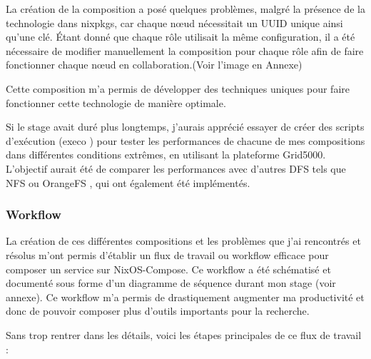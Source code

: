 \documentclass[a4paper,french,12pt, titlepage]{article}
\begin{document}
La création de la composition a posé quelques problèmes, malgré la
présence de la technologie dans nixpkgs, car chaque nœud nécessitait un
UUID unique ainsi qu'une clé. Étant donné que chaque rôle utilisait la
même configuration, il a été nécessaire de modifier manuellement la
composition pour chaque rôle afin de faire fonctionner chaque nœud en
collaboration.(Voir l'image en Annexe)\newline

Cette composition m'a permis de développer des techniques uniques pour
faire fonctionner cette technologie de manière optimale.\newline

Si le stage avait duré plus longtemps, j'aurais apprécié essayer de
créer des scripts d'exécution (execo \cite{execo2013}) pour tester les
performances de chacune de mes compositions dans différentes conditions
extrêmes, en utilisant la plateforme Grid5000. L'objectif aurait été de
comparer les performances avec d'autres DFS tels que NFS \cite{nfs1994}
ou OrangeFS \cite{orangefs2011}, qui ont également été
implémentés.\newline

\hypertarget{workflow}{%
\subsubsection{Workflow}\label{workflow}}

La création de ces différentes compositions et les problèmes que j'ai
rencontrés et résolus m'ont permis d'établir un flux de travail ou
workflow efficace pour composer un service sur NixOS-Compose. Ce
workflow a été schématisé et documenté sous forme d'un diagramme de
séquence durant mon stage (voir annexe). Ce workflow m'a permis de
drastiquement augmenter ma productivité et donc de pouvoir composer plus
d'outils importants pour la recherche.\newline

Sans trop rentrer dans les détails, voici les étapes principales de ce
flux de travail :
\end{document}
